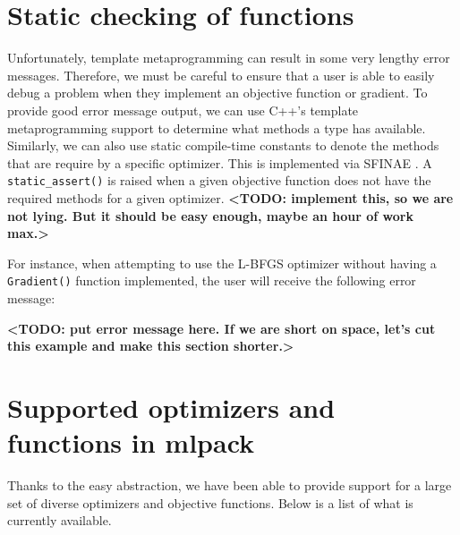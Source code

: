 \documentclass{article}
\begin{document}
\section{Static checking of functions}

{\bf <TODO: probably a better section title>}

Unfortunately, template metaprogramming can result in some very lengthy error
messages.  Therefore, we must be careful to ensure that a user is able to easily
debug a problem when they implement an objective function or gradient.  To
provide good error message output, we can use C++'s template metaprogramming
support to determine what methods a type has available.  Similarly, we can also
use static compile-time constants to denote the methods that are require by a
specific optimizer.  This is implemented via SFINAE \cite{sfinae}.  A {\tt
static\_assert()} is raised when a given objective function does not have the
required methods for a given optimizer.  {\bf <TODO: implement this, so we are
not lying.  But it should be easy enough, maybe an hour of work max.>}

For instance, when attempting to use the L-BFGS optimizer without having a
{\tt Gradient()} function implemented, the user will receive the following error
message:

{\bf <TODO: put error message here.  If we are short on space, let's cut this
example and make this section shorter.>}

\section{Supported optimizers and functions in mlpack}

Thanks to the easy abstraction, we have been able to provide support for a large
set of diverse optimizers and objective functions.  Below is a list of what is
currently available.
\end{document}
